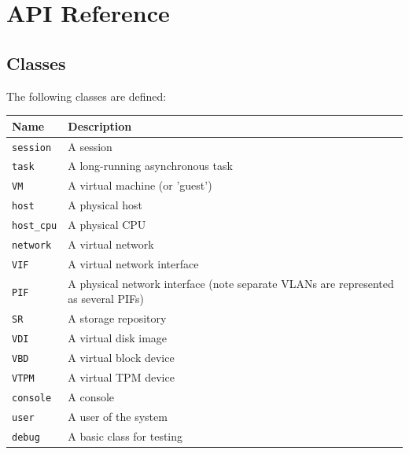 %
%
%
%

\chapter{API Reference}
\label{api-reference}


\section{Classes}
The following classes are defined:

\begin{center}\begin{tabular}{|lp{10cm}|}
\hline
Name & Description \\
\hline
{\tt session} & A session \\
{\tt task} & A long-running asynchronous task \\
{\tt VM} & A virtual machine (or 'guest') \\
{\tt host} & A physical host \\
{\tt host\_cpu} & A physical CPU \\
{\tt network} & A virtual network \\
{\tt VIF} & A virtual network interface \\
{\tt PIF} & A physical network interface (note separate VLANs are represented as several PIFs) \\
{\tt SR} & A storage repository \\
{\tt VDI} & A virtual disk image \\
{\tt VBD} & A virtual block device \\
{\tt VTPM} & A virtual TPM device \\
{\tt console} & A console \\
{\tt user} & A user of the system \\
{\tt debug} & A basic class for testing \\
\hline
\end{tabular}\end{center}
